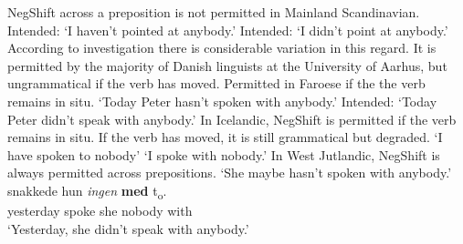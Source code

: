 \documentclass[12pt, letterpaper]{article}
\begin{document}
\ea NegShift across a preposition is not permitted in Mainland Scandinavian.
		\glt Intended: `I haven't pointed at anybody.'
	\glt Intended: `I didn't point at anybody.'
	\z 
\ex According to  investigation there is considerable variation in this regard. It is permitted by the majority of Danish linguists at the University of Aarhus, but ungrammatical if the verb has moved.
	\z 
\ex Permitted in Faroese if the the verb remains in situ.
	\glt `Today Peter hasn't spoken with anybody.'
	\glt Intended: `Today Peter didn't speak with anybody.'
	\z 
\ex In Icelandic, NegShift is permitted if the verb remains in situ. If the verb has moved, it is still grammatical but degraded.
	\glt `I have spoken to nobody'
	\glt `I spoke with nobody.'
	\z 
\ex In West Jutlandic, NegShift is always permitted across prepositions.
	\glt `She maybe hasn't spoken with anybody.'
	\ex 
	 snakkede hun \textit{ingen} \textbf{med} t\textsubscript{o}.\\
	yesterday spoke she nobody with\\
	\glt `Yesterday, she didn't speak with anybody.'
	\z 
\z 
\end{document}
